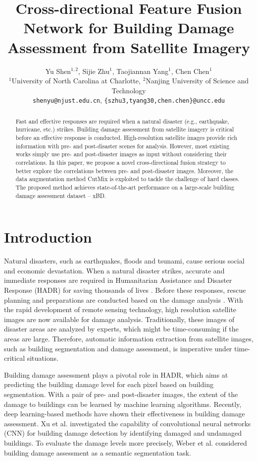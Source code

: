 \documentclass{article}
\title{Cross-directional Feature Fusion Network for Building Damage Assessment from Satellite Imagery}
\author{Yu Shen$^{1,2}$,
Sijie Zhu$^1$, Taojiannan Yang$^1$, Chen Chen$^1$ \\
 ${}^1$University of North Carolina at Charlotte, ${}^2$Nanjing University of Science and Technology\\
  \texttt{shenyu@njust.edu.cn}, \texttt{\{szhu3,tyang30,chen.chen\}@uncc.edu} \\
}
\begin{document}
\maketitle

\begin{abstract}
Fast and effective responses are required when a natural disaster (e.g., earthquake, hurricane, etc.) strikes. Building damage assessment from satellite imagery is critical before an effective response is conducted. High-resolution satellite images provide rich information with pre- and post-disaster scenes for analysis. However, most existing works simply use pre- and post-disaster images as input without considering their correlations. In this paper, we propose a novel cross-directional fusion strategy to better explore the correlations between pre- and post-disaster images. Moreover, the data augmentation method CutMix is exploited to tackle the challenge of hard classes. The proposed method achieves state-of-the-art performance on a large-scale building damage assessment dataset -- xBD.


\end{abstract}

\section{Introduction}
\label{secIntro}
Natural disasters, such as earthquakes, floods and tsunami, cause serious social and economic devastation. When a natural disaster strikes, accurate and immediate responses are required in Humanitarian Assistance and Disaster Response (HADR) for saving thousands of lives \cite{sidrane2019machine, doshi2019firenet}. Before these responses, rescue planning and preparations are conducted based on the damage analysis \cite{weber2020detecting}. With the rapid development of remote sensing technology, high resolution satellite images are now available for damage analysis. Traditionally, these images of disaster areas are analyzed by experts, which might be time-consuming if the areas are large. Therefore, automatic information extraction from satellite images, such as building segmentation and damage assessment, is imperative under time-critical situations. 

Building damage assessment plays a pivotal role in HADR, which aims at predicting the building damage level for each pixel based on building segmentation. With a pair of pre- and post-disaster images, the extent of the damage to buildings can be learned by machine learning algorithms. Recently, deep learning-based methods have shown their effectiveness in building damage assessment. Xu et al. \cite{xu2019building} investigated the capability of convolutional neural networks (CNN) for building damage detection by identifying damaged and undamaged buildings. To evaluate the damage levels more precisely, Weber et al. \cite{weber2020building} considered building damage assessment as a semantic segmentation task. 
\end{document}
